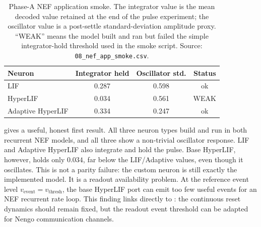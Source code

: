 \documentclass[11pt]{article}
\newcommand{\vth}{v_{\mathrm{thresh}}}
\newcommand{\code}[1]{\texttt{#1}}
\begin{document}
\begin{table}[t]
  \centering
  \caption{Phase-A NEF application smoke. The integrator value is the mean
  decoded value retained at the end of the pulse experiment; the oscillator
  value is a post-settle standard-deviation amplitude proxy. ``WEAK'' means the
  model built and ran but failed the simple integrator-hold threshold used in
  the smoke script. Source: \code{08\_nef\_app\_smoke.csv}.}
  \label{tab:nef-smoke}
  \begin{tabular}{lccc}
    \toprule
    Neuron & Integrator held & Oscillator std. & Status \\
    \midrule
    LIF & 0.287 & 0.598 & ok \\
    HyperLIF & 0.034 & 0.561 & WEAK \\
    Adaptive HyperLIF & 0.334 & 0.247 & ok \\
    \bottomrule
  \end{tabular}
\end{table}

 gives a useful, honest first result. All three neuron
types build and run in both recurrent NEF models, and all three show a
non-trivial oscillator response. LIF and Adaptive HyperLIF also integrate and
hold the pulse. Base HyperLIF, however, holds only \(0.034\), far below the
LIF/Adaptive values, even though it oscillates. This is not a parity failure:
the custom neuron is still exactly the implemented model. It is a readout
availability problem. At the reference event level \(v_{\mathrm{event}}=\vth\),
the base HyperLIF port can emit too few useful events for an NEF recurrent rate
loop. This finding links directly to : the continuous
reset dynamics should remain fixed, but the readout event threshold can be
adapted for Nengo communication channels.
\end{document}
